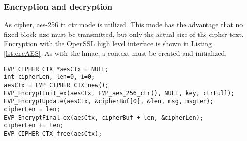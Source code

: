 \subsubsection{Encryption and decryption}
As cipher, \gls{aes}-256 in \gls{ctr} mode is utilized. This mode has the advantage that no fixed block size must be transmitted, but only the actual size of the cipher text.
Encryption with the OpenSSL high level interface is shown in Listing \ref{lst:encAES}. As with the \gls{hmac}, a context must be created and initialized.

\begin{lstlisting}[style=cStyle,caption={\gls{aes} encryption},label=lst:encAES]
EVP_CIPHER_CTX *aesCtx = NULL;
int cipherLen, len=0, i=0;
aesCtx = EVP_CIPHER_CTX_new();
EVP_EncryptInit_ex(aesCtx, EVP_aes_256_ctr(), NULL, key, ctrFull);
EVP_EncryptUpdate(aesCtx, &cipherBuf[0], &len, msg, msgLen);
cipherLen = len;
EVP_EncryptFinal_ex(aesCtx, cipherBuf + len, &cipherLen);
cipherLen += len;
EVP_CIPHER_CTX_free(aesCtx);
\end{lstlisting}

